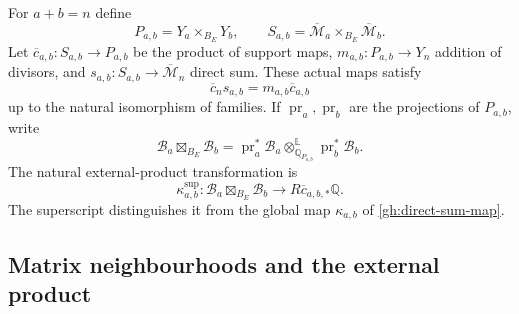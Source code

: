 For $a+b=n$ define
\[
 P_{a,b}=Y_a\times_{B_E}Y_b,\qquad
 S_{a,b}=\overline{\mathcal M}_a\times_{B_E}
                                      \overline{\mathcal M}_b.
\]
Let $\overline c_{a,b}:S_{a,b}\to P_{a,b}$ be the product of
support maps, $m_{a,b}:P_{a,b}\to Y_n$ addition of divisors,
and $s_{a,b}:S_{a,b}\to\overline{\mathcal M}_n$ direct sum.
These actual maps satisfy
\[
 \overline c_n s_{a,b}=m_{a,b}\overline c_{a,b}
\]
up to the natural isomorphism of families.
If $\operatorname{pr}_a,\operatorname{pr}_b$ are the projections
of $P_{a,b}$, write
\[
 \mathcal B_a\boxtimes_{B_E}\mathcal B_b
 =\operatorname{pr}_a^*\mathcal B_a
       \otimes^{\mathbb L}_{\mathbb Q_{P_{a,b}}}
                         \operatorname{pr}_b^*\mathcal B_b.
\]
The natural external-product transformation is
\begin{equation}\label{sc:kappa}
 \kappa^{\mathrm{sup}}_{a,b}:
 \mathcal B_a\boxtimes_{B_E}\mathcal B_b
       \longrightarrow R\overline c_{a,b,*}\mathbb Q.
\end{equation}
The superscript distinguishes it from the global map
$\kappa_{a,b}$ of \eqref{gh:direct-sum-map}.

\subsection{Matrix neighbourhoods and the external product}

